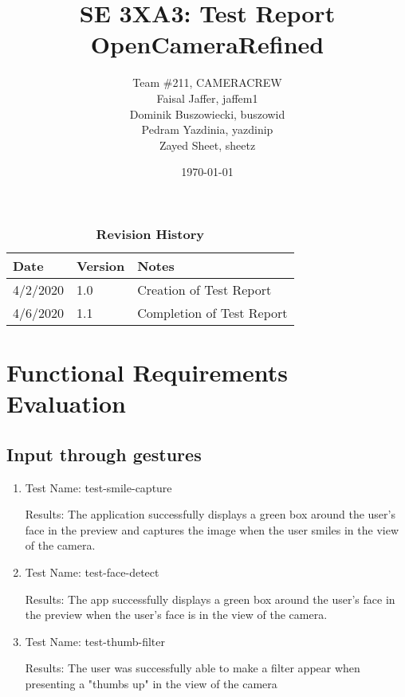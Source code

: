 \documentclass[12pt, titlepage]{article}
\title{SE 3XA3: Test Report\\OpenCameraRefined}
\author{Team \#211, CAMERACREW
		\\ Faisal Jaffer, jaffem1
		\\ Dominik Buszowiecki, buszowid
		\\ Pedram Yazdinia, yazdinip
		\\ Zayed Sheet, sheetz
}
\date{\today}
\begin{document}
\maketitle

\tableofcontents
\listoftables
\listoffigures
\newpage
\begin{table}[h]
\caption{\bf Revision History}
\begin{tabularx}{\textwidth}{p{3cm}p{2cm}X}
\toprule {\bf Date} & {\bf Version} & {\bf Notes}\\
\midrule
4/2/2020 & 1.0 & Creation of Test Report\\
4/6/2020 & 1.1 & Completion of Test Report\\
\bottomrule
\end{tabularx}
\end{table}

\newpage


\section{Functional Requirements Evaluation}
\subsection{Input through gestures}
\begin{enumerate}
    
    \item{Test Name: test-smile-capture}
    
     Results: The application successfully displays a green box around the user's face in the preview and captures the image when the user smiles in the view of the camera. \\
    
    \item{Test Name: test-face-detect}
    
    Results: The app successfully displays a green box around the user's face in the preview when the user's face is in the view of the camera. \\
    
    \item{Test Name: test-thumb-filter}
    
    Results: The user was successfully able to make a filter appear when presenting a "thumbs up" in the view of the camera\\
    
\end{enumerate}
\end{document}
